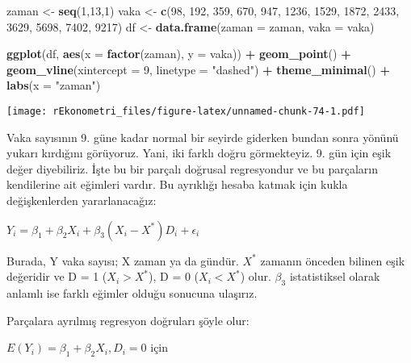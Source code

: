 \documentclass[
]{book}
\newenvironment{Shaded}{\begin{snugshade}}{\end{snugshade}}
\newcommand{\DataTypeTok}[1]{\textcolor[rgb]{0.13,0.29,0.53}{#1}}
\newcommand{\DecValTok}[1]{\textcolor[rgb]{0.00,0.00,0.81}{#1}}
\newcommand{\KeywordTok}[1]{\textcolor[rgb]{0.13,0.29,0.53}{\textbf{#1}}}
\newcommand{\NormalTok}[1]{#1}
\newcommand{\OperatorTok}[1]{\textcolor[rgb]{0.81,0.36,0.00}{\textbf{#1}}}
\newcommand{\StringTok}[1]{\textcolor[rgb]{0.31,0.60,0.02}{#1}}
\begin{document}
\begin{Shaded}
\begin{Highlighting}[]
\NormalTok{zaman <-}\StringTok{ }\KeywordTok{seq}\NormalTok{(}\DecValTok{1}\NormalTok{,}\DecValTok{13}\NormalTok{,}\DecValTok{1}\NormalTok{)}
\NormalTok{vaka <-}\StringTok{ }\KeywordTok{c}\NormalTok{(}\DecValTok{98}\NormalTok{, }\DecValTok{192}\NormalTok{, }\DecValTok{359}\NormalTok{, }\DecValTok{670}\NormalTok{, }\DecValTok{947}\NormalTok{, }\DecValTok{1236}\NormalTok{, }\DecValTok{1529}\NormalTok{, }\DecValTok{1872}\NormalTok{, }\DecValTok{2433}\NormalTok{, }\DecValTok{3629}\NormalTok{, }\DecValTok{5698}\NormalTok{, }\DecValTok{7402}\NormalTok{, }\DecValTok{9217}\NormalTok{)}
\NormalTok{df <-}\StringTok{ }\KeywordTok{data.frame}\NormalTok{(}\DataTypeTok{zaman =}\NormalTok{ zaman, }\DataTypeTok{vaka =}\NormalTok{ vaka)}

\KeywordTok{ggplot}\NormalTok{(df, }\KeywordTok{aes}\NormalTok{(}\DataTypeTok{x =} \KeywordTok{factor}\NormalTok{(zaman), }\DataTypeTok{y =}\NormalTok{ vaka)) }\OperatorTok{+}
\StringTok{  }\KeywordTok{geom_point}\NormalTok{() }\OperatorTok{+}
\StringTok{  }\KeywordTok{geom_vline}\NormalTok{(}\DataTypeTok{xintercept =} \DecValTok{9}\NormalTok{, }\DataTypeTok{linetype =} \StringTok{"dashed"}\NormalTok{) }\OperatorTok{+}
\StringTok{  }\KeywordTok{theme_minimal}\NormalTok{() }\OperatorTok{+}
\StringTok{  }\KeywordTok{labs}\NormalTok{(}\DataTypeTok{x =} \StringTok{"zaman"}\NormalTok{)}
\end{Highlighting}
\end{Shaded}

\texttt{[image: rEkonometri\_files/figure-latex/unnamed-chunk-74-1.pdf]}

Vaka sayısının 9. güne kadar normal bir seyirde giderken bundan sonra yönünü yukarı kırdığını görüyoruz. Yani, iki farklı doğru görmekteyiz. 9. gün için eşik değer diyebiliriz. İşte bu bir parçalı doğrusal regresyondur ve bu parçaların kendilerine ait eğimleri vardır. Bu ayrıklığı hesaba katmak için kukla değişkenlerden yararlanacağız:

\(Y_i = \beta_1 + \beta_2X_i + \beta_3(X_i - X^*)D_i + \epsilon_i\)

Burada, Y vaka sayısı; X zaman ya da gündür. \(X^*\) zamanın önceden bilinen eşik değeridir ve D = 1 (\(X_i > X^*\)), D = 0 (\(X_i < X^*\)) olur. \(\beta_3\) istatistiksel olarak anlamlı ise farklı eğimler olduğu sonucuna ulaşırız.

Parçalara ayrılmış regresyon doğruları şöyle olur:

\(E(Y_i) = \beta_1 + \beta_2X_i, D_i = 0\) için
\end{document}
